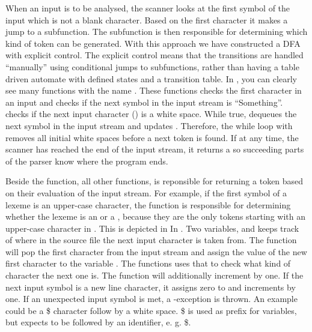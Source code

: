 When an input is to be analysed, the scanner looks at the first symbol of the input which is not a blank character. Based on the first character it makes a jump to a subfunction. The subfunction is then responsible for determining which kind of token can be generated. With this approach we have constructed a DFA with explicit control. The explicit control means that the transitions are handled ``manually'' using conditional jumps to subfunctions, rather than having a table driven automate with defined states and a transition table.
In , you can clearly see many functions with the name . These functions checks the first character in an input and checks if the next symbol in the input stream is ``Something''.  checks if the next input character () is a white space. While true,  dequeues the next symbol in the input stream and updates . Therefore, the while loop with  removes all initial white spaces before a next token is found. If at any time, the scanner has reached the end of the input stream, it returns a  so succeeding parts of the parser know where the program ends.

Beside the  function, all other  functions, is reponsible for returning a token based on their evaluation of the input stream.
For example, if the first symbol of a lexeme is an upper-case character, the function  is responsible for determining whether the lexeme is an  or a , because they are the only tokens starting with an upper-case character in \productname{}. This is depicted in In . Two variables,   and   keeps track of where in the source file the next input character is taken from. The function  will pop the first character from the input stream and assign the value of the new first character to the variable . The  functions uses that  to check what kind of character the next one is.
The  function will additionally increment  by one. If the next input symbol is a new line character, it assigns zero to   and increments  by one. If an unexpected input symbol is met, a -exception is thrown. An example could be a \$ character follow by a white space. \$ is used as prefix for variables, but expects to be followed by an identifier, e. g. \$.

 


